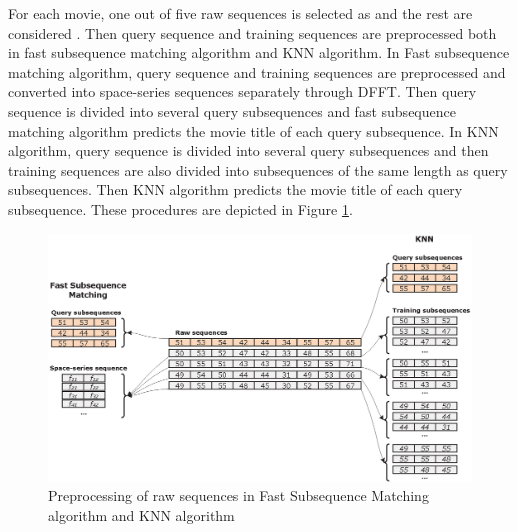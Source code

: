 For each movie, one out of five raw sequences is selected as  and the rest are considered .
Then query sequence and training sequences are preprocessed both in fast subsequence matching algorithm and KNN algorithm. 
In Fast subsequence matching algorithm, query sequence and training sequences are preprocessed and converted into space-series sequences separately through DFFT.
Then query sequence is divided into several query subsequences and fast subsequence matching algorithm predicts the movie title of each query subsequence. 
In KNN algorithm, query sequence is divided into several query subsequences and then training sequences are also divided into subsequences of the same length as query subsequences. 
Then KNN algorithm predicts the movie title of each query subsequence. 
These procedures are depicted in Figure \ref{fig:train_test_set}.

\begin{figure}[!h]
\centering
\includegraphics[scale=0.60]{Figures/TrainTestSet}
\caption{Preprocessing of raw sequences in Fast Subsequence Matching algorithm and KNN algorithm}
\label{fig:train_test_set}
\end{figure}






